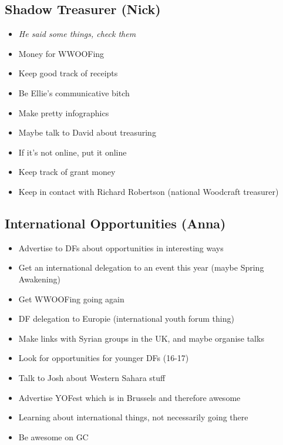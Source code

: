 \documentclass[a4paper, 11pt]{article} %
\begin{document}
\subsection{Shadow Treasurer (Nick)}
\begin{itemize}
	\item \emph{He said some things, check them}
	\item Money for WWOOFing
	\item Keep good track of receipts
	\item Be Ellie's communicative bitch
	\item Make pretty infographics
	\item Maybe talk to David about treasuring
	\item If it's not online, put it online
	\item Keep track of grant money
	\item Keep in contact with Richard Robertson (national Woodcraft treasurer)
\end{itemize}

\subsection{International Opportunities (Anna)}
\begin{itemize}
	\item Advertise to DFs about opportunities in interesting ways
	\item Get an international delegation to an event this year (maybe Spring Awakening)
	\item Get WWOOFing going again
	\item DF delegation to Europie (international youth forum thing)
	\item Make links with Syrian groups in the UK, and maybe organise talks
	\item Look for opportunities for younger DFs (16-17)
	\item Talk to Josh about Western Sahara stuff
	\item Advertise YOFest which is in Brussels and therefore awesome
	\item Learning about international things, not necessarily going there
	\item Be awesome on GC
\end{itemize}
\end{document}
